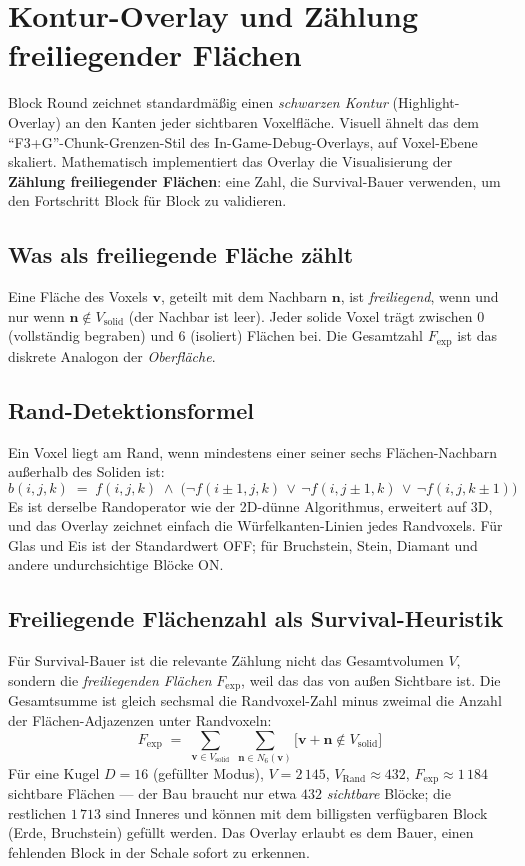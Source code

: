 \documentclass[12pt,a4paper]{scrartcl}
\newcommand{\acc}[1]{\textcolor{accent}{\textbf{#1}}}
\begin{document}
\section{Kontur-Overlay und Zählung freiliegender Flächen}

Block Round zeichnet standardmäßig einen \emph{schwarzen Kontur} (Highlight-Overlay) an den Kanten jeder sichtbaren Voxelfläche. Visuell ähnelt das dem \enquote{F3+G}-Chunk-Grenzen-Stil des In-Game-Debug-Overlays, auf Voxel-Ebene skaliert. Mathematisch implementiert das Overlay die Visualisierung der \acc{Zählung freiliegender Flächen}: eine Zahl, die Survival-Bauer verwenden, um den Fortschritt Block für Block zu validieren.

\subsection{Was als freiliegende Fläche zählt}
Eine Fläche des Voxels $\mathbf{v}$, geteilt mit dem Nachbarn $\mathbf{n}$, ist \emph{freiliegend}, wenn und nur wenn $\mathbf{n} \notin V_{\mathrm{solid}}$ (der Nachbar ist leer). Jeder solide Voxel trägt zwischen $0$ (vollständig begraben) und $6$ (isoliert) Flächen bei. Die Gesamtzahl $F_{\mathrm{exp}}$ ist das diskrete Analogon der \emph{Oberfläche}.

\subsection{Rand-Detektionsformel}
Ein Voxel liegt am Rand, wenn mindestens einer seiner sechs Flächen-Nachbarn außerhalb des Soliden ist:
\[
b(i,j,k) \;=\; f(i,j,k) \;\wedge\; \bigl(\neg f(i{\pm}1,j,k)\,\vee\,\neg f(i,j{\pm}1,k)\,\vee\,\neg f(i,j,k{\pm}1)\bigr)
\]
Es ist derselbe Randoperator wie der 2D-dünne Algorithmus, erweitert auf 3D, und das Overlay zeichnet einfach die Würfelkanten-Linien jedes Randvoxels. Für Glas und Eis ist der Standardwert OFF; für Bruchstein, Stein, Diamant und andere undurchsichtige Blöcke ON.

\subsection{Freiliegende Flächenzahl als Survival-Heuristik}
Für Survival-Bauer ist die relevante Zählung nicht das Gesamtvolumen $V$, sondern die \emph{freiliegenden Flächen} $F_{\mathrm{exp}}$, weil das das von außen Sichtbare ist. Die Gesamtsumme ist gleich sechsmal die Randvoxel-Zahl minus zweimal die Anzahl der Flächen-Adjazenzen unter Randvoxeln:
\[
F_{\mathrm{exp}} \;=\; \sum_{\mathbf{v}\in V_{\mathrm{solid}}}\;\sum_{\mathbf{n}\in N_6(\mathbf{v})}\!\!\bigl[\mathbf{v}+\mathbf{n}\notin V_{\mathrm{solid}}\bigr]
\]
Für eine Kugel $D=16$ (gefüllter Modus), $V = 2\,145$, $V_{\mathrm{Rand}} \approx 432$, $F_{\mathrm{exp}} \approx 1\,184$ sichtbare Flächen --- der Bau braucht nur etwa $432$ \emph{sichtbare} Blöcke; die restlichen $1\,713$ sind Inneres und können mit dem billigsten verfügbaren Block (Erde, Bruchstein) gefüllt werden. Das Overlay erlaubt es dem Bauer, einen fehlenden Block in der Schale sofort zu erkennen.
\end{document}
